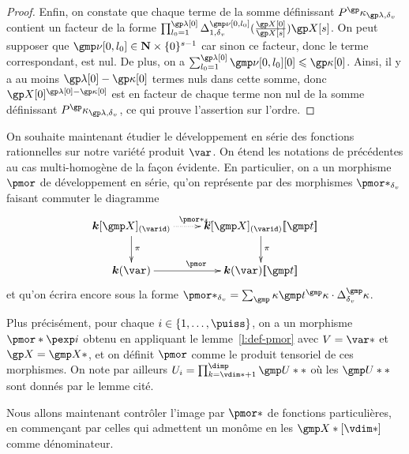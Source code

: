 \begin{proof}
  Enfin, on constate que chaque terme de la somme définissant
  \( P^\derp_{\ip, \dv} \) contient un facteur de la forme
  \(
    \prod_{\indi_0 = 1}^{\ip[0]}
    \pmnum_{1, \dv}^{\gmp\nu[0, \indi_0]}( \frac{ \vp[0] }{ \vp[\anydim] } )
    \vp[\anydim]
  \). On peut supposer que \( \gmp\nu[0, \indi_0] \in \N \times
    \set{0}^{\anydim-1} \) car sinon ce facteur, donc le terme correspondant,
  est nul. De plus, on a \( \sum_{\indi_0 = 1}^{\ip[0]} \gmp\nu[0, \indi_0][0]
    \le \derp[0] \). Ainsi, il y a au moins \( \ip[0] - \derp[0] \) termes
  nuls dans cette somme, donc \( \vp[0]^{\ip[0] - \derp[0]} \) est en
  facteur de chaque terme non nul de la somme définissant \( P^\derp_{\ip,
      \dv} \), ce qui prouve l'assertion sur l'ordre.
\end{proof}

On souhaite maintenant étudier le développement en série des fonctions
rationnelles sur notre variété produit \( \var \).  On étend les notations de
précédentes au cas multi-homogène de la façon évidente. En particulier, on a
un morphisme \( \pmor \) de développement en série, qu'on représente par des
morphismes \( \pmor*_\dv \) faisant commuter le diagramme
\begin{equation} \label{pmor*-prod}
  \xymatrix{
    \cdn[\vmp]_{(\varid)}                 \ar[d]^\pi  \ar@{.>}[r]^{\pmor*_\dv}
    & \cdn[\vmp]_{(\varid)} \series\psmp  \ar[d]^\pi
    \\ \cdn(\var)                                     \ar[r]^{\pmor}
    & \cdn(\var)\series\psmp
  }
\end{equation}
et qu'on écrira encore sous la forme \( \pmor*_\dv = \sum_\dermp \psmp^\dermp
  \cdot \pdiff^\dermp \).

Plus précisément, pour chaque \( \fct \in \set{1, \dots, \puiss} \), on a un
morphisme \( \pmor*\pexp\fct \) obtenu en appliquant le lemme~\ref{l:def-pmor}
avec \( V = \var* \) et \( \vp = \vmp* \), et on définit \( \pmor \) comme le
produit tensoriel de ces morphismes. On note par ailleurs \( \pden_\fct =
  \prod_{\ind=\vdim*+1}^{\dimp} \gmp\pden** \) où les \( \gmp\pden** \) sont
donnés par le lemme cité.

Nous allons maintenant contrôler l'image par \( \pmor* \) de fonctions
particulières, en commençant par celles qui admettent un monôme en les \(
  \vmp*[\vdim*] \) comme dénominateur.

